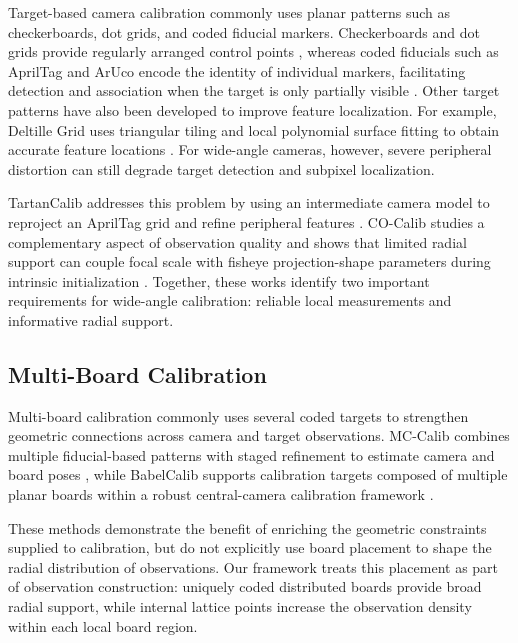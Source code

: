 \documentclass[letterpaper, 10 pt, conference]{ieeeconf}  %
\begin{document}
Target-based camera calibration commonly uses planar patterns such as
checkerboards, dot grids, and coded fiducial markers.
Checkerboards and dot grids provide regularly arranged control points
\cite{zhang2000flexible,heikkila2000circular}, whereas coded fiducials
such as AprilTag and ArUco encode the identity of individual markers,
facilitating detection and association when the target is only partially
visible
\cite{olson2011apriltag,garridojurado2014automatic}.
Other target patterns have also been developed to improve feature
localization. For example, Deltille Grid uses triangular tiling and local
polynomial surface fitting to obtain accurate feature locations
\cite{ha2017deltille}.
For wide-angle cameras, however, severe peripheral distortion can still
degrade target detection and subpixel localization.

TartanCalib addresses this problem by using an intermediate camera model
to reproject an AprilTag grid and refine peripheral features
\cite{duisterhof2022tartancalib}.
CO-Calib studies a complementary aspect of observation quality and shows
that limited radial support can couple focal scale with fisheye
projection-shape parameters during intrinsic initialization
\cite{liu2026observation}.
Together, these works identify two important requirements for
wide-angle calibration: reliable local measurements and informative
radial support.


\subsection{Multi-Board Calibration}

Multi-board calibration commonly uses several coded targets to strengthen
geometric connections across camera and target observations. MC-Calib
combines multiple fiducial-based patterns with staged refinement to
estimate camera and board poses
\cite{rameau2022mccalib}, while BabelCalib supports calibration targets
composed of multiple planar boards within a robust central-camera
calibration framework
\cite{lochman2021babelcalib}.

These methods demonstrate the benefit of enriching the geometric
constraints supplied to calibration, but do not explicitly use board
placement to shape the radial distribution of observations. Our
framework treats this placement as part of observation construction:
uniquely coded distributed boards provide broad radial support, while
internal lattice points increase the observation density within each
local board region.
\end{document}
